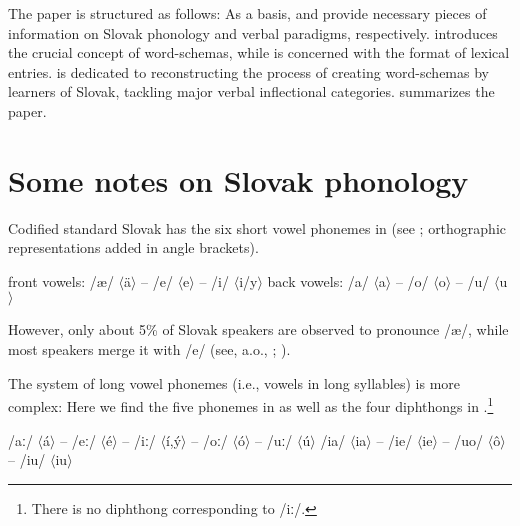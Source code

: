 \documentclass[output=paper,colorlinks,citecolor=brown,
]{langscibook}
\begin{document}
The paper is structured as follows: As a basis,  and  provide necessary pieces of information on Slovak phonology and verbal paradigms, respectively.  introduces the crucial concept of word-schemas, while  is concerned with the format of lexical entries.  is dedicated to reconstructing the process of creating word-schemas by learners of Slovak, tackling major verbal inflectional categories.  summarizes the paper.


\section{Some notes on Slovak phonology}\label{sec:SlovakPhonology}

Codified standard Slovak has the six short vowel phonemes in  (see \citealt[534]{Short1993}; orthographic representations added in angle brackets).

\ea\label{ex:ShortVowels}
\ea front vowels: /\ae/ $\langle$ä$\rangle$ -- /e/ $\langle$e$\rangle$ -- /i/ $\langle$i/y$\rangle$ 
\ex back vowels: /a/ $\langle$a$\rangle$ -- /o/ $\langle$o$\rangle$ -- /u/ $\langle$u$\rangle$
\z\z

\noindent However, only about 5\% of Slovak speakers are observed to pronounce /\ae/, while most speakers merge it with /e/ (see, a.o., \citealt[534]{Short1993}; \citealt[375]{Hanulikova.Hamann2010}).

The system of long vowel phonemes (i.e., vowels in long syllables) is more complex: Here we find the five phonemes in  as well as the four diphthongs in  \citep[see][534]{Short1993}.\footnote{There is no diphthong corresponding to /iː/.}

\ea
\ea /aː/ $\langle$á$\rangle$ -- /eː/ $\langle$é$\rangle$ -- /iː/ $\langle$í,ý$\rangle$ -- /oː/ $\langle$ó$\rangle$ -- /uː/ $\langle$ú$\rangle$ \label{ex:LongVowels}
\ex /ia/ $\langle$ia$\rangle$ -- /ie/ $\langle$ie$\rangle$ -- /uo/ $\langle$ô$\rangle$ -- /iu/ $\langle$iu$\rangle$ \label{ex:Diphthongs}
\z\z
\end{document}
